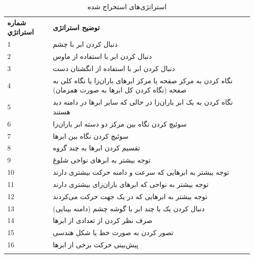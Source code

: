 \documentclass[twoside, a4paper,11pt]{book}
\numberwithin{equation}{chapter}
\numberwithin{table}{chapter}
\numberwithin{figure}{chapter}
\numberwithin{equation}{chapter}
\begin{document}
\begin{table}[]
	
	\centering
	\caption{استراتژی‌های استخراج شده}
	\label{StrategyList}
	\begin{tabularx}{\textwidth}{|l|X|}
		\hhline{|-|-|}
		\rowcolor{gray!50}
		\textbf{شماره استراتژي} & \textbf{توضیح استراتژی} \\ \hhline{|-|-|}
		\rowcolor{stBlue!100}
		1 & دنبال کردن ابر با چشم \\ \hhline{|-|-|}
		\rowcolor{stBlue!100}
		
		2 & دنبال کردن ابر با استفاده از ماوس \\ \hhline{|-|-|}
		\rowcolor{stBlue!100}
		3 & دنبال کردن ابر با استفاده از انگشتان دست \\ \hhline{|-|-|}
		\rowcolor{stGreen!100}
		4 & نگاه کردن به مرکز صفحه یا مرکز ابرهای باران‌زا یا نگاه کلی به صفحه (نگاه کردن کل ابرها به صورت همزمان) \\ \hhline{|-|-|}
		\rowcolor{stGreen!100}
		5 & نگاه کردن به یک ابر باران‌زا در حالی که سایر ابرها در دامنه دید هستند \\ \hhline{|-|-|}
		\rowcolor{stGreen!100}
		6 & سوئیچ کردن نگاه بین مرکز دو دسته ابر باران‌زا \\ \hhline{|-|-|}
		\rowcolor{stRed!100}
		7 & سوئیچ کردن نگاه بین ابرها \\ \hhline{|-|-|}
		\rowcolor{stYellow!100}
		8 & تقسیم کردن ابرها به چند گروه \\ \hhline{|-|-|}
		\rowcolor{stOrange!100}
		9 & توجه بیشتر به ابرهای نواحی شلوغ \\ \hhline{|-|-|}
		\rowcolor{stOrange!100}
		10 & توجه بیشتر به ابرهایی که سرعت و دامنه حرکت بیشتری دارند \\ \hhline{|-|-|}
		\rowcolor{stOrange!100}
		11 & توجه بیشتر به نواحی که ابرهای باران‌زای بیشتری دارند \\ \hhline{|-|-|}
		\rowcolor{stOrange!100}
		12 & توجه بیشتر به ابرهایی که در یک جهت حرکت می‌کردند \\ \hhline{|-|-|}
		\rowcolor{stPink!100}
		13 & دنبال کردن یک یا چند ابر با گوشه چشم (دامنه بینایی) \\ \hhline{|-|-|}
		\rowcolor{stGray!100}
		14 & صرف نظر کردن از تعدادی از ابرها \\ \hhline{|-|-|}
		\rowcolor{stPurple!100}
		15 & تصور کردن به صورت خط یا شکل هندسی \\ \hhline{|-|-|}
		\rowcolor{stBrown!100}
		16 & پیش‌بینی حرکت برخی از ابرها \\ \hhline{|-|-|}

\end{tabularx}
\end{table}
\end{document}
